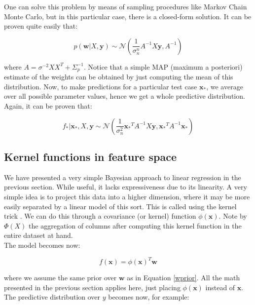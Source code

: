\documentclass[10pt,a4paper,twoside]{book}
\begin{document}
One can solve this problem by means of sampling procedures like Markov Chain Monte Carlo, but in this particular case, there is a closed-form solution. It can be proven quite easily that:

\begin{equation}
p(\boldsymbol{w}|X, \boldsymbol{y}) \sim \mathcal{N} \left(\dfrac{1}{\sigma_n^n}A^{-1}X\boldsymbol{y}, A^{-1}\right)
\end{equation}

where $A = \sigma^{-2}XX^T + \Sigma_p^{-1}$. Notice that a simple MAP (maximum a posteriori) estimate of the weights can be obtained by just computing the mean of this distribution. Now, to make predictions for a particular test case $\boldsymbol{x_{*}}$, we average over all possible parameter values, hence we get a whole predictive distribution. Again, it can be proven that:

\begin{equation}
f_{*}|\boldsymbol{x_{*}}, X, \boldsymbol{y} \sim \mathcal{N}\left(\dfrac{1}{\sigma_n^2}\boldsymbol{x_{*}}^T A^{-1}X\boldsymbol{y}, \boldsymbol{x_*}^T A^{-1} \boldsymbol{x}_{*}\right)
\end{equation} 

\subsection{Kernel functions in feature space}

We have presented a very simple Bayesian approach to linear regression in the previous section. While useful, it lacks expressiveness due to its linearity. A very simple idea is to project this data into a higher dimension, where it may be more easily separated by a linear model of this sort. This is called using the kernel trick \cite{Hofmann2008}. We can do this through a covariance (or kernel) function $\phi(\boldsymbol{x})$. Note by $\Phi(X)$ the aggregation of columns after computing this kernel function in the entire dataset at hand.\\

The model becomes now:

\begin{equation}
f(\boldsymbol{x}) = \phi(\boldsymbol{x})^T \boldsymbol{w}
\end{equation}

where we assume the same prior over $\boldsymbol{w}$ as in Equation \ref{wprior}. All the math presented in the previous section applies here, just placing $\phi(\boldsymbol{x})$ instead of $\boldsymbol{x}$. The predictive distribution over $y$ becomes now, for example:
\end{document}
